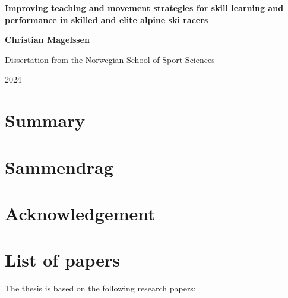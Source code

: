 \documentclass[12pt, twoside]{report}
\begin{document}
\begin{titlepage}
    \begin{center}
        \vspace*{1cm}
            
        \Huge
        \textbf{Improving teaching and movement strategies for skill learning and performance in skilled and elite alpine ski racers}
            
        \vspace{0.5cm}
        \large
            
        \vspace{1.5cm}
            
        \textbf{Christian Magelssen}
            
        \vfill
            
        Dissertation from the Norwegian School of Sport Sciences
            
        \vspace{0.8cm}
            
        \large
        2024
            
    \end{center}
\end{titlepage}


\newcommand{\RNum}[1]{\uppercase\expandafter{\romannumeral #1\relax}}



\chapter*{Summary}


\chapter*{Sammendrag}


\chapter*{Acknowledgement}


\chapter*{List of papers}
The thesis is based on the following research papers:
\end{document}
